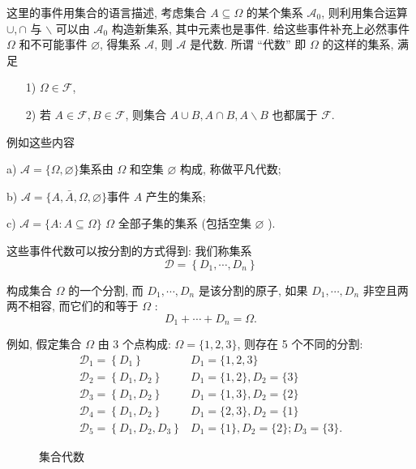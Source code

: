 这里的事件用集合的语言描述, 考虑集合 $A \subseteq \Omega$ 的某个集系 $\mathscr{A}_0$, 则利用集合运算 $\cup, \cap$ 与 $\backslash$ 可以由 $\mathscr{A}_0$ 构造新集系, 其中元素也是事件. 给这些事件补充上必然事件 $\Omega$ 和不可能事件 $\varnothing$, 得集系 $\mathscr{A}$, 则 $\mathcal{A}$ 是代数. 所谓 “代数” 即 $\Omega$ 的这样的集系, 满足
\begin{itemize}
    \item [1)] $\Omega \in \mathcal{F}$,
    \item    [2)] 若 $A \in \mathcal{F}, B \in \mathcal{F}$, 则集合 $A \cup B, A \cap B, A \backslash B$ 也都属于 $\mathcal{F}$.
\end{itemize}

例如这些内容
\begin{example}
    a) $\mathscr{A}=\{\Omega, \varnothing\}$集系由 $\Omega$ 和空集 $\varnothing$ 构成, 称做平凡代数;

b) $\mathscr{A}=\{A, \bar{A}, \Omega, \varnothing\}$事件 $A$ 产生的集系;

c) $\mathscr{A}=\{A: A \subseteq \Omega\}$ $\Omega$ 全部子集的集系 (包括空集 $\varnothing$ ).
\end{example}

这些事件代数可以按分割的方式得到: 我们称集系
$$
\mathscr{D}=\left\{D_1, \cdots, D_n\right\}
$$

构成集合 $\Omega$ 的一个分割, 而 $D_1, \cdots, D_n$ 是该分割的原子, 如果 $D_1, \cdots, D_n$ 非空且两两不相容, 而它们的和等于 $\Omega$ :
$$
D_1+\cdots+D_n=\Omega .
$$

例如, 假定集合 $\Omega$ 由 3 个点构成: $\Omega=\{1,2,3\}$, 则存在 5 个不同的分割:
$$
\begin{array}{ll}
\mathscr{D}_1=\left\{D_1\right\} & D_1=\{1,2,3\} \\
\mathscr{D}_2=\left\{D_1, D_2\right\} & D_1=\{1,2\}, D_2=\{3\} \\
\mathscr{D}_3=\left\{D_1, D_2\right\} & D_1=\{1,3\}, D_2=\{2\} \\
\mathscr{D}_4=\left\{D_1, D_2\right\} & D_1=\{2,3\}, D_2=\{1\} \\
\mathscr{D}_5=\left\{D_1, D_2, D_3\right\} & D_1=\{1\}, D_2=\{2\} ; D_3=\{3\} .
\end{array}
$$

\begin{wrapfigure}{l}{0.6\textwidth}
     
    \caption{集合代数}
    \label{fig:set-alg}
\end{wrapfigure}

